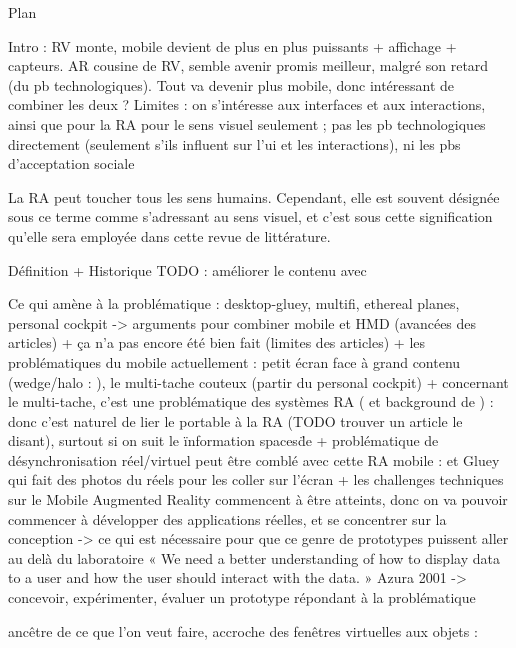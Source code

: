 Plan

Intro : RV monte, mobile devient de plus en plus puissants + affichage + capteurs. AR cousine de RV, semble avenir promis meilleur, malgré son retard (du pb technologiques). Tout va devenir plus mobile, donc intéressant de combiner les deux ?
\cite{DeSaChurchill2013}
Limites : on s'intéresse aux interfaces et aux interactions, ainsi que pour la RA pour le sens visuel seulement ; pas les pb technologiques directement (seulement s'ils influent sur l'ui et les interactions), ni les pbs d'acceptation sociale 

La RA peut toucher tous les sens humains. Cependant, elle est souvent désignée sous ce terme comme s'adressant au sens visuel, et c'est sous cette signification qu'elle sera employée dans cette revue de littérature.


Définition + Historique
TODO : améliorer le contenu avec \cite{Chalon2004}

Ce qui amène à la problématique : desktop-gluey, multifi, ethereal planes, personal cockpit -> arguments pour combiner mobile et HMD (avancées des articles) + ça n'a pas encore été bien fait (limites des articles)
+ les problématiques du mobile actuellement : petit écran face à grand contenu (wedge/halo : \cite{BaudischRosenholtz2003} \cite{GustafsonBaudischGutwinEtAl2008} \cite{BurigatChittaro2011}), le multi-tache couteux (partir du personal cockpit)
+ concernant le multi-tache, c'est une problématique des systèmes RA (\cite{SchmalstiegFuhrmannHesinaEtAl2002} et background de \cite{EnsFinneganIrani2014}) : donc c'est naturel de lier le portable à la RA (TODO trouver un article le disant), surtout si on suit le \"information spaces\" de \cite{EnsHincapie-RamosIrani2014}
+ problématique de désynchronisation réel/virtuel peut être comblé avec cette RA mobile : \cite{Chalon2004} et Gluey qui fait des photos du réels pour les coller sur l'écran
+ les challenges techniques sur le Mobile Augmented Reality commencent à être atteints, donc on va pouvoir commencer à développer des applications réelles, et se concentrer sur la conception -> ce qui est nécessaire pour que ce genre de prototypes puissent aller au delà du laboratoire
« We need a better understanding of how to display data
to a user and how the user should interact with the data. » Azura 2001
-> concevoir, expérimenter, évaluer un prototype répondant à la problématique

ancêtre de ce que l'on veut faire, accroche des fenêtres virtuelles aux objets : \cite{FeinerMacIntyreHauptEtAl1993}

